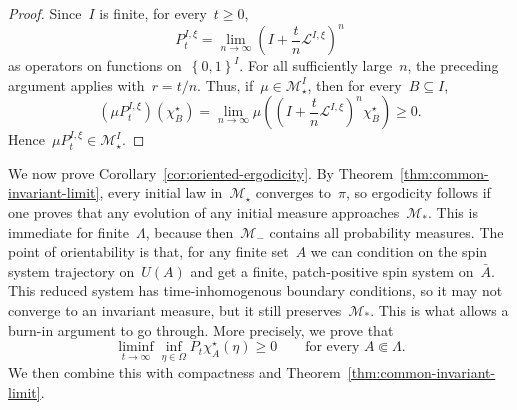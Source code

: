 \documentclass[EJP,preprint,NODS,nobera]{ejpecp}
\newcommand{\bb}[1]{\left(#1\right)}
\newcommand{\cb}[1]{\left\{#1\right\}}
\newcommand{\Lcal}{\mathcal{L}}
\begin{document}
\begin{proof}
Since~$I$ is finite, for every~$t\geq0$,
\begin{equation*}
P_t^{I,\xi}
=
\lim_{n\to\infty}
\bb{
I+\frac{t}{n}\Lcal^{I,\xi}
}^n
\end{equation*}
as operators on functions on~$\cb{0,1}^I$. For all sufficiently large~$n$,
the preceding argument applies with~$r=t/n$. Thus, if~$\mu\in\mathcal M_\star^I$, then for every~$B\subseteq I$,
\begin{equation*}
(\mu P_t^{I,\xi})(\chi_B^\star)
=
\lim_{n\to\infty}
\mu\bb{
\bb{
I+\frac{t}{n}\Lcal^{I,\xi}
}^n
\chi_B^\star
}
\geq0.
\end{equation*}
Hence~$\mu P_t^{I,\xi}\in\mathcal M_\star^I$.
\end{proof}

We now prove Corollary~\ref{cor:oriented-ergodicity}. By
Theorem~\ref{thm:common-invariant-limit}, every initial law in~$\mathcal M_\star$ converges to~$\pi$, so ergodicity follows if one proves that any evolution of any initial measure approaches~$\mathcal{M}_*$. This is immediate  for finite~$\Lambda$, because then~$\mathcal{M}_-$ contains all probability measures. The point of orientability is that,
for any finite set~$A$ we can condition on the spin system trajectory on~$U(A)$ and get a finite, patch-positive spin system on~$\bar{A}$. This reduced system has time-inhomogenous boundary conditions, so it may not converge to an invariant measure, but it still preserves~$\mathcal{M}_*$. This is what allows a burn-in argument to go through. More precisely, we prove that
\begin{equation*}
\liminf_{t\to\infty}
\inf_{\eta\in\Omega}
P_t\chi_A^\star(\eta)
\geq0
\qquad
\text{for every }A\Subset\Lambda.
\end{equation*}
We then combine this with compactness and
Theorem~\ref{thm:common-invariant-limit}.
\end{document}
